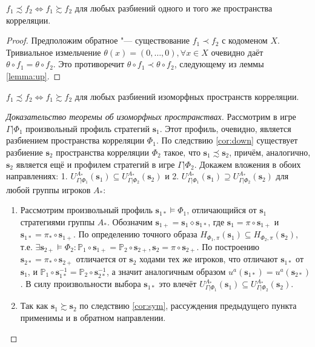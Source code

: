 \begin{lemma}
	$f_1 \precsim f_2 \Leftrightarrow f_1 \succsim f_2$ для любых разбиений одного и того же пространства корреляции.
\end{lemma}

\begin{proof}
	Предположим обратное "--- существование $f_1 \prec f_2$ с кодоменом $X$. Тривиальное измельчение $\theta(x) = (0, \ldots, 0), \forall x \in X$ очевидно даёт $\theta \circ f_1 = \theta \circ f_2$. Это противоречит $\theta \circ f_1 \prec \theta \circ f_2$, следующему из леммы \ref{lemma:up}.
\end{proof}

\begin{corollary} \label{cor:sym}
	$f_1 \precsim f_2 \Leftrightarrow f_1 \succsim f_2$ для любых разбиений изоморфных пространств корреляции.
\end{corollary}

\begin{proof}[Доказательство теоремы об изоморфных пространствах]
	Рассмотрим в игре $\Gamma | \Phi_1$ произвольный профиль стратегий $\mathbf{s}_1$. Этот профиль, очевидно, является разбиением пространства корреляции $\Phi_1$. По следствию \ref{cor:down} существует разбиение $\mathbf{s}_2$ пространства корреляции $\Phi_2$ такое, что $\mathbf{s}_1 \precsim \mathbf{s}_2$, причём, аналогично, $\mathbf{s}_2$ является ещё и профилем стратегий в игре $\Gamma | \Phi_2$. Докажем вложения в обоих направлениях: 1. $U_{\Gamma | \Phi_1}^{A_*}(\mathbf{s}_1) \subseteq U_{\Gamma | \Phi_2}^{A_*}(\mathbf{s}_2)$ и 2. $U_{\Gamma | \Phi_1}^{A_*}(\mathbf{s}_1) \supseteq U_{\Gamma | \Phi_2}^{A_*}(\mathbf{s}_2)$ для любой группы игроков $A_*$:
	\begin{enumerate}
		\item Рассмотрим произвольный профиль $\mathbf{s}_{1*} \models \Phi_1$, отличающийся от $\mathbf{s}_1$ стратегиями группы $A_*$. Обозначим $\mathbf{s}_{1+} = \mathbf{s}_1 \diamond \mathbf{s}_{1*}$, где $\mathbf{s}_1 = \pi \circ \mathbf{s}_{1+}$ и $\mathbf{s}_{1*} = \pi_* \circ \mathbf{s}_{1+}$. По определению точного образа $H_{\Phi_1,\pi}(\mathbf{s}_1) \subseteq H_{\Phi_2,\pi}(\mathbf{s}_2)$, т.е. $\exists \mathbf{s}_{2+} \models \Phi_2 : \mathbb{P}_1 \circ \mathbf{s}_{1+} = \mathbb{P}_2 \circ \mathbf{s}_{2+}, \mathbf{s}_2 = \pi \circ \mathbf{s}_{2+}$. По построению $\mathbf{s}_{2*} = \pi_* \circ \mathbf{s}_{2+}$ отличается от $\mathbf{s}_2$ ходами тех же игроков, что отличают $\mathbf{s}_{1*}$ от $\mathbf{s}_1$, и $\mathbb{P}_1 \circ \mathbf{s}_{1*}^{-1} = \mathbb{P}_2 \circ \mathbf{s}_{2*}^{-1}$, а значит аналогичным образом $u^a(\mathbf{s}_{1*}) = u^a(\mathbf{s}_{2*})$. В силу произвольности выбора $\mathbf{s}_{1*}$ это влечёт $U_{\Gamma | \Phi_1}^{A_*}(\mathbf{s}_1) \subseteq U_{\Gamma | \Phi_2}^{A_*}(\mathbf{s}_2)$.
		\item Так как $\mathbf{s}_1 \succsim \mathbf{s}_2$ по следствию \ref{cor:sym}, рассуждения предыдущего пункта применимы и в обратном направлении.
	\end{enumerate}
\end{proof}

